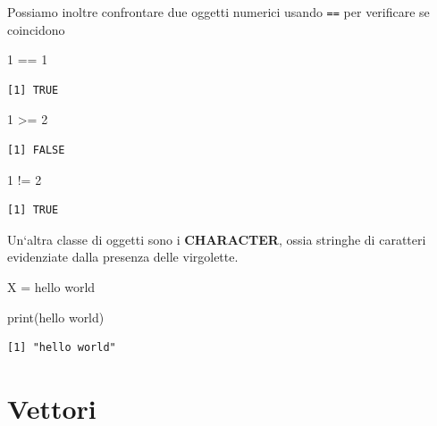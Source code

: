 \documentclass[
  italian,
  letterpaper,
]{book}
\newenvironment{Shaded}{\begin{snugshade}}{\end{snugshade}}
\newcommand{\DecValTok}[1]{\textcolor[rgb]{0.68,0.00,0.00}{#1}}
\newcommand{\FunctionTok}[1]{\textcolor[rgb]{0.28,0.35,0.67}{#1}}
\newcommand{\NormalTok}[1]{\textcolor[rgb]{0.00,0.23,0.31}{#1}}
\newcommand{\OtherTok}[1]{\textcolor[rgb]{0.00,0.23,0.31}{#1}}
\newcommand{\SpecialCharTok}[1]{\textcolor[rgb]{0.37,0.37,0.37}{#1}}
\newcommand{\StringTok}[1]{\textcolor[rgb]{0.13,0.47,0.30}{#1}}
\theoremstyle{definition}
\theoremstyle{remark}
\begin{document}
Possiamo inoltre confrontare due oggetti numerici usando \texttt{==} per
verificare se coincidono

\begin{Shaded}
\begin{Highlighting}[]
\DecValTok{1} \SpecialCharTok{==} \DecValTok{1} 
\end{Highlighting}
\end{Shaded}

\begin{verbatim}
[1] TRUE
\end{verbatim}

\begin{Shaded}
\begin{Highlighting}[]
\DecValTok{1} \SpecialCharTok{\textgreater{}=} \DecValTok{2}
\end{Highlighting}
\end{Shaded}

\begin{verbatim}
[1] FALSE
\end{verbatim}

\begin{Shaded}
\begin{Highlighting}[]
\DecValTok{1} \SpecialCharTok{!=} \DecValTok{2}
\end{Highlighting}
\end{Shaded}

\begin{verbatim}
[1] TRUE
\end{verbatim}

Un`altra classe di oggetti sono i \textbf{CHARACTER}, ossia stringhe di
caratteri evidenziate dalla presenza delle virgolette.

\begin{Shaded}
\begin{Highlighting}[]
\NormalTok{X }\OtherTok{=} \StringTok{\textquotesingle{}hello world\textquotesingle{}}

\FunctionTok{print}\NormalTok{(}\StringTok{\textquotesingle{}hello world\textquotesingle{}}\NormalTok{)}
\end{Highlighting}
\end{Shaded}

\begin{verbatim}
[1] "hello world"
\end{verbatim}

\section{Vettori}\label{vettori}
\end{document}
